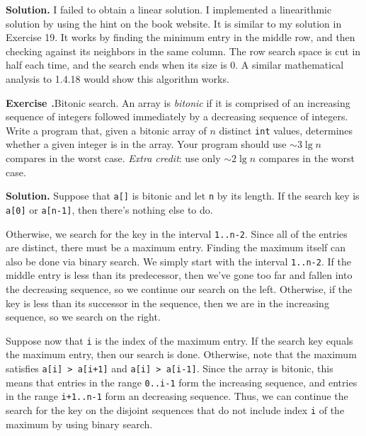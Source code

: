 \documentclass[12pt, a4paper]{article}
\newenvironment{ex}[2][Exercise]
{\par\medskip\noindent \textbf{#1 #2.}}
{\medskip}
\newenvironment{sol}[1][Solution]
{\par\medskip\noindent \textbf{#1.} }
{\medskip}
\begin{document}
	\begin{sol}
		I failed to obtain a linear solution. I implemented a linearithmic solution by using the
		hint on the book website. It is similar to my solution in Exercise 19. It works by
		finding the minimum entry in the middle row, and then checking against its neighbors
		in the same column. The row search space is cut in half each time, and the search ends
		when its size is $0$. A similar mathematical analysis to 1.4.18 would show this algorithm
		works.
	\end{sol}
	
	\begin{ex}{20}
		\emph{Bitonic search}. An array is \emph{bitonic} if it is comprised of an increasing sequence
		of integers followed immediately by a decreasing sequence of integers. Write a program
		that, given a bitonic array of $n$ distinct \texttt{int} values, determines whether a given
		integer is in the array. Your program should use $\sim 3\lg n$ compares in the worst
		case. \emph{Extra credit}: use only $\sim 2\lg n$ compares in the worst case.
	\end{ex}
	\begin{sol}
		Suppose that \texttt{a[]} is bitonic and let \texttt{n} by its length. If the
		search key is \texttt{a[0]} or \texttt{a[n-1]}, then there's nothing else to do.
		
		Otherwise, we search for the key in the interval \texttt{1..n-2}. Since all of the entries
		are distinct, there must be a maximum entry. Finding the maximum itself can also be done via
		binary search. We simply start with the interval \texttt{1..n-2}. If the middle entry is less
		than its predecessor, then we've gone too far and fallen into the decreasing sequence, so we
		continue our search on the left. Otherwise, if the key is less than its successor in the sequence,
		then we are in the increasing sequence, so we search on the right.
		
		Suppose now that \texttt{i} is the index of the maximum entry. If the search key equals the
		maximum entry, then our search is done. Otherwise, note that the maximum satisfies \texttt{a[i] > a[i+1]}
		and \texttt{a[i] > a[i-1]}. Since the array is bitonic, this means that entries in the range
		\texttt{0..i-1} form the increasing sequence, and entries in the range \texttt{i+1..n-1} form an
		decreasing sequence. Thus, we can continue the search for the key on the disjoint sequences that
		do not include index \texttt{i} of the maximum by using binary search.
	\end{sol}
\end{document}
